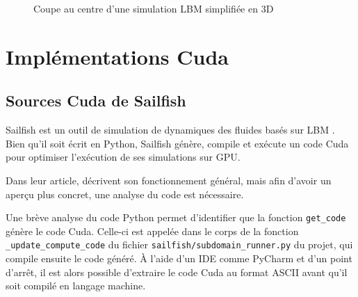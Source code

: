 \begin{figure}[h]
{		\label{fig:lbm_simple_3d_420}
	}	
	\caption{Coupe au centre d'une simulation \ac{LBM} simplifiée en 3D}
	\label{fig:lbm_simple_3d}
\end{figure}
\clearpage

\section{Implémentations Cuda}
\subsection{Sources Cuda de Sailfish}
Sailfish est un outil de simulation de dynamiques des fluides basés sur \ac{LBM} . Bien qu'il soit écrit en Python, Sailfish génère, compile et exécute un code Cuda pour optimiser l'exécution de ses simulations sur \acs{GPU}.

Dans leur article, \citet{januszewski_sailfish_2014} décrivent son fonctionnement général, mais afin d'avoir un aperçu plus concret, une analyse du code est nécessaire. 

Une brève analyse du code Python permet d'identifier que la fonction \texttt{get\_code} génère le code Cuda. Celle-ci est appelée dans le corps de la fonction \texttt{\_update\_compute\_code} du fichier \texttt{sailfish/subdomain\_runner.py} du projet, qui compile ensuite le code généré. À l'aide d'un \acs{IDE} comme PyCharm et d'un point d'arrêt, il est alors possible d'extraire le code Cuda au format \acs{ASCII} avant qu'il soit compilé en langage machine.

